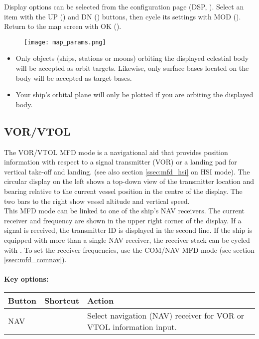 \documentclass[Orbiter User Manual.tex]{subfiles}
\begin{document}
\noindent
Display options can be selected from the configuration page (DSP, \Shift{}). Select an item with the UP (\Shift\keystroke{-}) and DN (\Shift\keystroke{=}) buttons, then cycle its settings with MOD (\Shift{}). Return to the map screen with OK (\Shift{}).

\begin{figure}[H]
  \centering
  \texttt{[image: map\_params.png]}
\end{figure}

\begin{itemize}
\item Only objects (ships, stations or moons) orbiting the displayed celestial body will be accepted as orbit targets. Likewise, only surface bases located on the body will be accepted as target bases.
\item Your ship's orbital plane will only be plotted if you are orbiting the displayed body.
\end{itemize}


\subsection{VOR/VTOL}
The VOR/VTOL MFD mode is a navigational aid that provides position information with respect to a signal transmitter (VOR) or a landing pad for vertical take-off and landing. (see also section \ref{ssec:mfd_hsi} on HSI mode). The circular display on the left shows a top-down view of the transmitter location and bearing relative to the current vessel position in the centre of the display. The two bars to the right show vessel altitude and vertical speed.\\
This MFD mode can be linked to one of the ship's NAV receivers. The current receiver and frequency are shown in the upper right corner of the display. If a signal is received, the transmitter ID is displayed in the second line. If the ship is equipped with more than a single NAV receiver, the receiver stack can be cycled with \Shift{}. To set the receiver frequencies, use the COM/NAV MFD mode (see section \ref{ssec:mfd_comnav}).\\
\\
\textbf{Key options:}

	\begin{longtable}{ |p{}|p{}|p{}| }
	\hline\rule{0pt}{2ex}
	\textbf{Button} & \textbf{Shortcut} & \textbf{Action}\\
	\hline\rule{0pt}{2ex}
	NAV & \Shift\keystroke{N} & Select navigation (NAV) receiver for VOR or VTOL information input.\\
	\hline
	\end{longtable}
\end{document}
